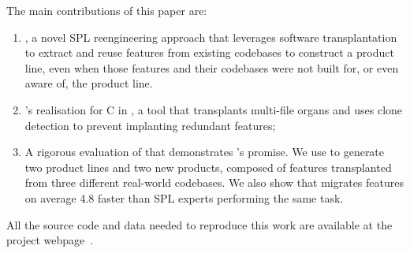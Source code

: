 The main contributions of this paper are: 
\begin{enumerate}
    \item \FOUNDRY, a novel SPL reengineering approach that leverages software transplantation to extract and reuse features from existing codebases to construct a product line, even when those features and their codebases were not built for, or even aware of, the product line.

    \item \FOUNDRY's realisation for C in \prodscalpel, a  tool that transplants multi-file organs and uses clone detection to prevent implanting redundant features;
    
   \item A rigorous evaluation of \prodscalpel that demonstrates \FOUNDRY's promise. We use \prodscalpel to generate two product lines and two new products, composed of features transplanted from three different real-world codebases. We also show that \prodscalpel migrates features on average 4.8 faster than SPL experts performing the same task.

\end{enumerate}

 All the source code and data needed to reproduce this work are available at the project webpage~\cite{ProjectWebpage}.


